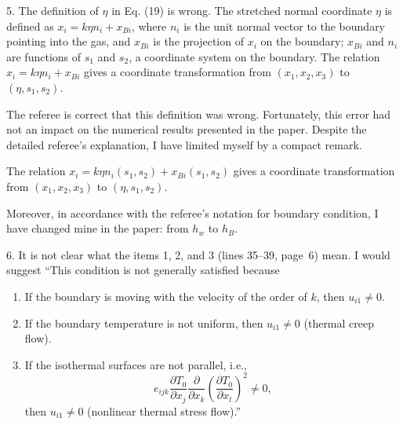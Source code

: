 \documentclass{article}
\newcommand{\pder}[2][]{\frac{\partial#1}{\partial#2}}
\begin{document}
\begin{quoting} 
5. The definition of \(\eta\) in Eq. (19) is wrong. The stretched normal
coordinate \(\eta\) is defined as \(x_i = k\eta n_i + x_{Bi}\), where \(n_i\) is the unit normal
vector to the boundary pointing into the gas, and \(x_{Bi}\) is the projection
of \(x_i\) on the boundary; \(x_{Bi}\) and \(n_i\) are functions of \(s_1\) and \(s_2\), a
coordinate system on the boundary. The relation \(x_i = k\eta n_i + x_{Bi}\) gives a
coordinate transformation from \((x_1, x_2, x_3)\) to \((\eta, s_1, s_2)\).
\end{quoting}

The referee is correct that this definition was wrong.
Fortunately, this error had not an impact on the numerical results presented in the paper.
Despite the detailed referee's explanation, I have limited myself by a compact remark.
\begin{leftbar}
The relation \( x_i = k\eta n_i(s_1,s_2) + x_{Bi}(s_1, s_2) \) gives a coordinate transformation
from \((x_1,x_2,x_3)\) to \((\eta,s_1,s_2)\).
\end{leftbar}
Moreover, in accordance with the referee's notation for boundary condition,
I have changed mine in the paper: from \(h_w\) to \(h_B\).

\begin{quoting} 
6. It is not clear what the items 1, 2, and 3 (lines 35--39, page~6)
mean. I would suggest ``This condition is not generally satisfied because
\begin{enumerate}
\item If the boundary is moving with the velocity of the order of \(k\), then \(u_{i1} \neq 0\).
\item If the boundary temperature is not uniform, then \(u_{i1} \neq 0\) (thermal creep flow).
\item If the isothermal surfaces are not parallel, i.e.,
\[e_{ijk}\pder[T_0]{x_j}\pder{x_k}\left(\pder[T_0]{x_l}\right)^2 \neq 0, \]
then \(u_{i1} \neq 0\) (nonlinear thermal stress flow).''
\end{enumerate}
\end{quoting}
\end{document}

